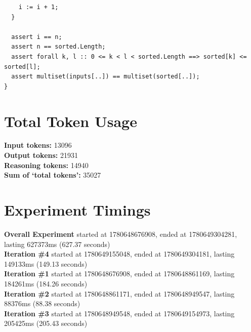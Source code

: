 \documentclass{article}
\begin{document}
\begin{lstlisting}
    i := i + 1;
  }

  assert i == n;
  assert n == sorted.Length;
  assert forall k, l :: 0 <= k < l < sorted.Length ==> sorted[k] <= sorted[l];
  assert multiset(inputs[..]) == multiset(sorted[..]);
}
\end{lstlisting}
\section*{Total Token Usage}
\textbf{Input tokens: }13096
\\\textbf{Output tokens: }21931
\\\textbf{Reasoning tokens: }14940
\\\textbf{Sum of `total tokens': }35027
\section*{Experiment Timings}
\textbf{Overall Experiment} started at 1780648676908, ended at 1780649304281, lasting 627373ms (627.37 seconds)
\\\textbf{Iteration \#4} started at 1780649155048, ended at 1780649304181, lasting 149133ms (149.13 seconds)
\\\textbf{Iteration \#1} started at 1780648676908, ended at 1780648861169, lasting 184261ms (184.26 seconds)
\\\textbf{Iteration \#2} started at 1780648861171, ended at 1780648949547, lasting 88376ms (88.38 seconds)
\\\textbf{Iteration \#3} started at 1780648949548, ended at 1780649154973, lasting 205425ms (205.43 seconds)
\end{document}
